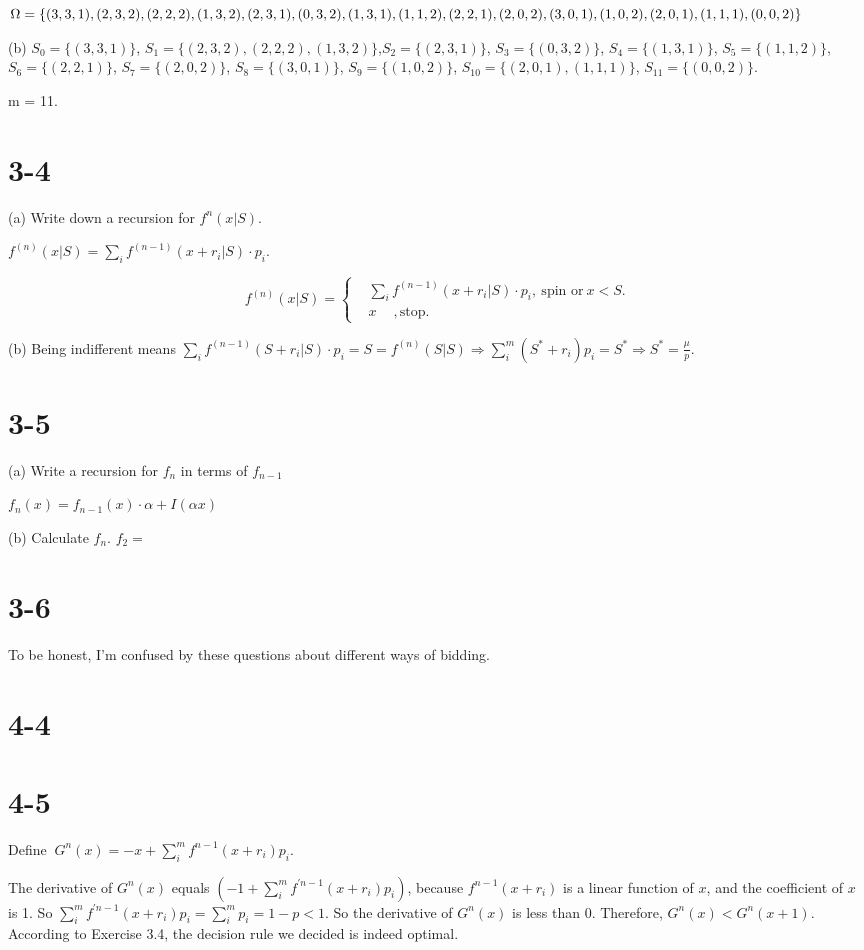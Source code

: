 \documentclass[UTF8]{article}
\begin{document}
$\Omega =\{(3,3,1),(2,3,2),(2,2,2),(1,3,2),(2,3,1),(0,3,2),(1,3,1),\\(1,1,2),(2,2,1),(2,0,2),(3,0,1),(1,0,2),(2,0,1),(1,1,1),(0,0,2)\}$

(b) $S_0 = \{(3,3,1)\}$, $S_1 = \{(2,3,2),(2,2,2),(1,3,2)\}$,$S_2 = \{(2,3,1)\}$, $S_3 = \{(0,3,2)\}$, $S_4 = \{(1,3,1)\}$, $S_5 = \{(1,1,2)\}$, $S_6 = \{(2,2,1)\}$, $S_7 = \{(2,0,2)\}$, $S_8 = \{(3,0,1)\}$, $S_9 = \{(1,0,2)\}$, $S_{10} = \{(2,0,1),(1,1,1)\}$, $S_{11} = \{(0,0,2)\}$.

m = 11.

\section*{3-4}
(a) Write down a recursion for $f^n(x|S)$.

 $f^{(n)}(x|S)= \sum_{i} f^{(n-1)}(x+r_i|S)\cdot p_i$.

 $$ f^{(n)}(x|S)=\left\{
 \begin{aligned}
 & \sum_{i} f^{(n-1)}(x+r_i|S)\cdot p_i,~ \text{spin or}~ x<S.  \\
 & x ~\quad, \text{stop}.
 \end{aligned}
 \right.
 $$

 (b) Being indifferent means $\sum_{i} f^{(n-1)}(S+r_i|S)\cdot p_i = S = f^{(n)}(S|S) \Rightarrow \sum_i^m(S^*+r_i)p_i = S^* \Rightarrow S^* = \frac{\mu}{p}$.

\section*{3-5}
(a) Write a recursion for $f_n$ in terms of $f_{n-1}$

$f_n(x) = f_{n-1}(x) \cdot \alpha + I(\alpha x)$

(b) Calculate $f_n$.
$f_2 = $


\section*{3-6}
To be honest, I'm confused by these questions about different ways of bidding.

\section*{4-4}


\section*{4-5}
Define $~G^n (x) = -x + \sum_i^m f^{n-1}(x+r_i)p_i$.

The derivative of $G^n (x)$ equals $(-1 + \sum_i^m f^{'n-1}(x+r_i)p_i)$, because $f^{n-1}(x+r_i)$ is a linear function of $x$, and the coefficient of $x$ is 1. So $\sum_i^m f^{'n-1}(x+r_i)p_i = \sum_i^m p_i = 1-p < 1$. So the derivative of $G^n (x)$ is less than 0. Therefore, $G^n (x) < G^n (x+1)$. According to Exercise 3.4, the decision rule we decided is indeed optimal.
\end{document}
